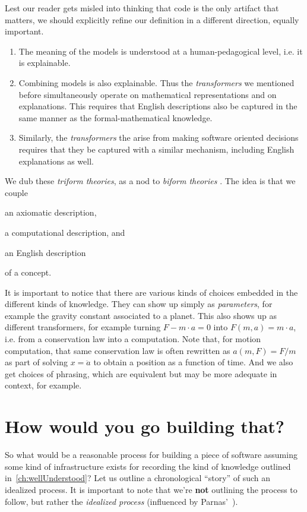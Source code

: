 \documentclass[10pt,twoside,onecolumn,openany,letterpaper]{memoir}
\begin{document}
Lest our reader gets misled into thinking that code is the only artifact
that matters, we should explicitly refine our definition in a different
direction, equally important.
\begin{enumerate}
\item The meaning of the models is understood at a human-pedagogical
level, i.e. it is explainable.
\item Combining models is also explainable. Thus the \emph{transformers}
we mentioned before simultaneously operate on mathematical representations
and on explanations. This requires that English descriptions also be
captured in the same manner as the formal-mathematical knowledge.
\item Similarly, the \emph{transformers} the arise from making software
oriented decisions requires that they be captured with a similar mechanism,
including English explanations as well.
\end{enumerate}

We dub these \emph{triform theories}, as a nod to \emph{biform theories}%
\cite{Farmer}. The idea is that we couple 
\begin{enumerate*}
\item an axiomatic description,
\item a computational description, and
\item an English description
\end{enumerate*}
of a concept.

It is important to notice that there are various kinds of choices
embedded in the different kinds of knowledge. They can show up simply as
\emph{parameters}, for example the gravity constant associated to a planet.
This also shows up as different transformers, for example turning
$F - m\cdot a = 0$ into $F\left(m, a\right) = m\cdot a$, i.e. from a 
conservation law into a computation. Note that, for motion computation, that
same conservation law is often rewritten as $a\left(m,F\right) = F/m$ as
part of solving $x = \ddot{a}$ to obtain a position as a function of time.
And we also get choices of phrasing, which are equivalent but may be more
adequate in context, for example.

\chapter{How would you go building that?}\label{ch:process}

So what would be a reasonable process for building a piece of software
assuming some kind of infrastructure exists for recording the kind of
knowledge outlined in~\autoref{ch:wellUnderstood}? Let us outline a
chronological ``story'' of such an idealized process.  It is important to
note that we're \textbf{not} outlining the process to follow, but rather
the \emph{idealized process} (influenced by Parnas'~\cite{RationalDesign}).
\end{document}
